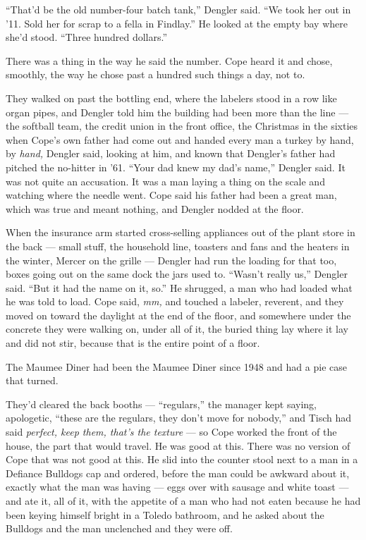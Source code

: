 \documentclass[11pt,openany]{book}
\newcommand{\scenebreak}{\par\vspace{0.5\baselineskip}\begin{center}\textasteriskcentered\quad\textasteriskcentered\quad\textasteriskcentered\end{center}\vspace{0.5\baselineskip}\par}
\begin{document}
``That'd be the old number-four batch tank,'' Dengler said. ``We took her out in '11. Sold her for scrap to a fella in Findlay.'' He looked at the empty bay where she'd stood. ``Three hundred dollars.''

There was a thing in the way he said the number. Cope heard it and chose, smoothly, the way he chose past a hundred such things a day, not to.

They walked on past the bottling end, where the labelers stood in a row like organ pipes, and Dengler told him the building had been more than the line --- the softball team, the credit union in the front office, the Christmas in the sixties when Cope's own father had come out and handed every man a turkey by hand, by \textit{hand,} Dengler said, looking at him, and known that Dengler's father had pitched the no-hitter in '61. ``Your dad knew my dad's name,'' Dengler said. It was not quite an accusation. It was a man laying a thing on the scale and watching where the needle went. Cope said his father had been a great man, which was true and meant nothing, and Dengler nodded at the floor.

When the insurance arm started cross-selling appliances out of the plant store in the back --- small stuff, the household line, toasters and fans and the heaters in the winter, Mercer on the grille --- Dengler had run the loading for that too, boxes going out on the same dock the jars used to. ``Wasn't really us,'' Dengler said. ``But it had the name on it, so.'' He shrugged, a man who had loaded what he was told to load. Cope said, \textit{mm,} and touched a labeler, reverent, and they moved on toward the daylight at the end of the floor, and somewhere under the concrete they were walking on, under all of it, the buried thing lay where it lay and did not stir, because that is the entire point of a floor.


\scenebreak


The Maumee Diner had been the Maumee Diner since 1948 and had a pie case that turned.

They'd cleared the back booths --- ``regulars,'' the manager kept saying, apologetic, ``these are the regulars, they don't move for nobody,'' and Tisch had said \textit{perfect, keep them, that's the texture} --- so Cope worked the front of the house, the part that would travel. He was good at this. There was no version of Cope that was not good at this. He slid into the counter stool next to a man in a Defiance Bulldogs cap and ordered, before the man could be awkward about it, exactly what the man was having --- eggs over with sausage and white toast --- and ate it, all of it, with the appetite of a man who had not eaten because he had been keying himself bright in a Toledo bathroom, and he asked about the Bulldogs and the man unclenched and they were off.
\end{document}
